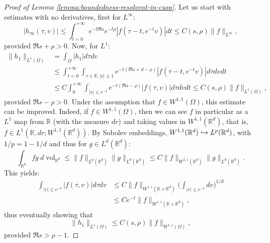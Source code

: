 \documentclass[JEP,XML,SOM,Unicode,NoFloatCountersInSection]{cedram}
\newcommand\hto{\mathrel{\lhook\joinrel\to}}
\newcommand{\R}{\mathbb{R}}
\DeclareMathOperator{\vol}{\mathrm{vol}}
\theoremstyle{plain}
\theoremstyle{definition}
\begin{document}
\begin{proof}[Proof of Lemma \ref{lemma:boundedness-resolvent-in-cusp}]
Let us start with estimates with no derivatives, first for $L^\infty$:
\[
|h_\infty(\tau,v)| \leq \int_{t=0}^{+\infty} e^{-t \Re s} e^{- t\rho} |f(\tau-t,e^{-t}v)| dt \leq C(s,\rho) \|f\|_{L^\infty},
\]
provided $\Re s+ \rho >0$. Now, for $L^1$:
\[
\begin{split}
\|h_1\|_{L^1(\Omega)} & = \int_{\Omega} |h_1| d\tau dv \\
& \leq \int_{t=0}^{+\infty} \int_{\tau \in \R, |v|\leq 1} e^{-t(\Re s+d-\rho)} |f(\tau - t, e^{-t} v)| d\tau dv dt \\
& \leq C \int_0^{+\infty} \int_{|v|\leq e^{-t} } e^{-t(\Re s -\rho)} |f(\tau, v)| d\tau dv dt \leq C(s,\rho) \|f\|_{L^1(\Omega)},
\end{split}
\]
provided $\Re s - \rho > 0$. Under the assumption that $f \in W^{1,1}(\Omega)$, this estimate can be improved. Indeed, if $f\in W^{1,1}(\Omega)$, then we can see $f$ in particular as a $L^1$ map from $\R$ (with the measure $dr$) and taking values in $W^{1,1}(\R^d)$, that is, $f \in L^1(\R, dr ; W^{1,1}(\R^d))$. By Sobolev embeddings, $W^{1,1}(\R^d) \hto L^p(\R^d)$, with $1/p = 1-1/d$ and thus for $g\in L^{d}(\R^d)$:
\[
\int_{\R^d} f g~ d\vol_{\R^d} \leq \|f\|_{L^p(\R^d)} \|g\|_{L^d(\R^d)} \leq C \| f \|_{W^{1,1}(\R^d)} \|g \|_{L^{d}(\R^d)}.
\]
This yields:
\begin{equation}
\label{equation:sioux}
\begin{split}
\int_{|v|\leq e^{-t} } |f(\tau,v)| d\tau dv & \leq C\|f\|_{W^{1,1}(\R \times \R^d)} \biggl( \int_{ |v|\leq e^{-t} } dv \biggr)^{1/d} \\
& \leq C e^{-t} \|f\|_{W^{1,1}(\R \times \R^d)},
\end{split}
\end{equation}
thus eventually showing that
\[
\|h_1\|_{L^1(\Omega)} \leq C(s,\rho) \|f\|_{W^{1,1}(\Omega)},
\]
provided $\Re s > \rho -1$.


\end{proof}
\end{document}
